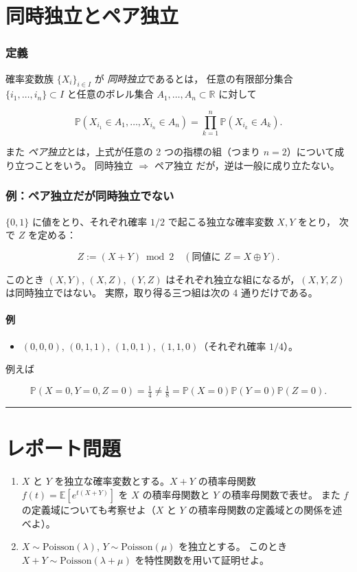 \documentclass[uplatex,dvipdfmx,11pt,a4paper,openany]{bxjsbook}
\begin{document}
\section{同時独立とペア独立}
\subsubsection{定義}
確率変数族 $\{X_i\}_{i\in I}$ が \emph{同時独立}であるとは，
                任意の有限部分集合 $\{i_1,\dots,i_n\}\subset I$ と任意のボレル集合 $A_1,\dots,A_n\subset\mathbb R$ に対して

\[\mathbb P(X_{i_1}\in A_1,\dots,X_{i_n}\in A_n)
                = \prod_{k=1}^{n}\mathbb P(X_{i_k}\in A_k).\]

また \emph{ペア独立}とは，上式が任意の 2 つの指標の組（つまり $n=2$）について成り立つことをいう。
                同時独立 $\Rightarrow$ ペア独立 だが，逆は一般に成り立たない。

\subsubsection{例：ペア独立だが同時独立でない}
$\{0,1\}$ に値をとり、それぞれ確率 $1/2$ で起こる独立な確率変数 $X,Y$ をとり，
                次で $Z$ を定める：

\[Z := (X+Y)\bmod 2 \quad (\text{同値に } Z = X\oplus Y).\]

このとき $(X,Y)$, $(X,Z)$, $(Y,Z)$ はそれぞれ独立な組になるが，$(X,Y,Z)$ は同時独立ではない。
                実際，取り得る三つ組は次の 4 通りだけである。

\paragraph{例}
\begin{itemize}
\item $(0,0,0)$, $(0,1,1)$, $(1,0,1)$, $(1,1,0)$（それぞれ確率 $1/4$）。
\end{itemize}


例えば

\[\mathbb P(X=0,Y=0,Z=0)=\tfrac14 \neq \tfrac18
                =\mathbb P(X=0)\mathbb P(Y=0)\mathbb P(Z=0).\]

\medskip\hrule\medskip
\section{レポート問題}
\begin{enumerate}
\item $X$ と $Y$ を独立な確率変数とする。$X+Y$ の積率母関数
                    $f(t)=\mathbb E[e^{t(X+Y)}]$ を $X$ の積率母関数と $Y$ の積率母関数で表せ。
                    また $f$ の定義域についても考察せよ（$X$ と $Y$ の積率母関数の定義域との関係を述べよ）。
\item $X\sim\mathrm{Poisson}(\lambda)$, $Y\sim\mathrm{Poisson}(\mu)$ を独立とする。
                    このとき $X+Y\sim\mathrm{Poisson}(\lambda+\mu)$ を特性関数を用いて証明せよ。
\end{enumerate}
\end{document}
